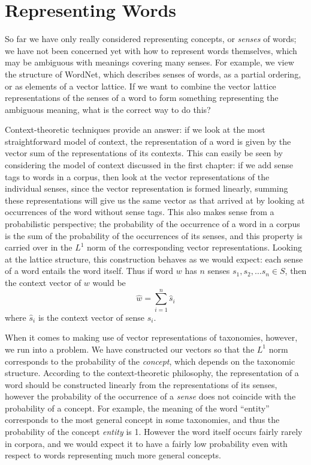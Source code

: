 \documentclass{report}
\begin{document}
\section{Representing Words}

So far we have only really considered representing concepts, or \emph{senses} of words; we have not been concerned yet with how to represent words themselves, which may be ambiguous with meanings covering many senses. For example, we view the structure of WordNet, which describes senses of words, as a partial ordering, or as elements of a vector lattice. If we want to combine the vector lattice representations of the senses of a word to form something representing the ambiguous meaning, what is the correct way to do this?

Context-theoretic techniques provide an answer: if we look at the most straightforward model of context, the representation of a word is given by the vector sum of the representations of its contexts. This can easily be seen by considering the model of context discussed in the first chapter: if we add sense tags to words in a corpus, then look at the vector representations of the individual senses, since the vector representation is formed linearly, summing these representations will give us the same vector as that arrived at by looking at occurrences of the word without sense tags. This also makes sense from a probabilistic perspective; the probability of the occurrence of a word in a corpus is the sum of the probability of the occurrences of its senses, and this property is carried over in the $L^1$ norm of the corresponding vector representations. Looking at the lattice structure, this construction behaves as we would expect: each sense of a word entails the word itself. Thus if word $w$ has $n$ senses $s_1, s_2, \ldots s_n \in S$, then the context vector of $w$ would be
$$\hat{w} = \sum_{i=1}^n \hat{s}_i$$
where $\hat{s}_i$ is the context vector of sense $s_i$.

When it comes to making use of vector representations of taxonomies, however, we run into a problem. We have constructed our vectors so that the $L^1$ norm corresponds to the probability of the \emph{concept}, which depends on the taxonomic structure. According to the context-theoretic philosophy, the representation of a word should be constructed linearly from the representations of its senses, however the probability of the occurrence of a \emph{sense} does not coincide with the probability of a concept. For example, the meaning of the word ``entity'' corresponds to the most general concept in some taxonomies, and thus the probability of the concept \emph{entity} is 1. However the word itself occurs fairly rarely in corpora, and we would expect it to have a fairly low probability even with respect to words representing much more general concepts.
\end{document}
